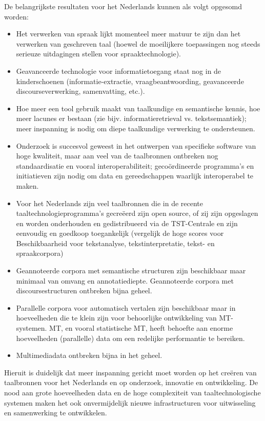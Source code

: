 \documentclass[]{../../metanetpaper}
\begin{document}
\begin{multicols}{2}
{De belangrijkste resultaten voor het Nederlands kunnen als volgt opgesomd worden:
\begin{itemize}
   \item Het verwerken van spraak lijkt momenteel meer matuur te zijn dan het verwerken van geschreven taal (hoewel de moeilijkere toepassingen nog steeds serieuze uitdagingen stellen voor spraaktechnologie).
   \item Geavanceerde technologie voor informatietoegang staat nog in de kinderschoenen (informatie-extractie, vraagbeantwoording, geavanceerde discourseverwerking, samenvatting, etc.).
   \item Hoe meer een tool gebruik maakt van taalkundige en semantische kennis, hoe meer lacunes er bestaan (zie bijv. informatieretrieval vs. tekstsemantiek); meer inspanning is nodig om diepe taalkundige verwerking te ondersteunen.
   \item Onderzoek is succesvol geweest in het ontwerpen van specifieke software van hoge kwaliteit, maar aan veel van de taalbronnen ontbreken nog standaardisatie en vooral interoperabiliteit; geco{\"o}rdineerde programma's en initiatieven zijn nodig om data en gereedschappen waarlijk interoperabel te maken.
   \item Voor het Nederlands zijn veel taalbronnen die in de recente taaltechnologieprogramma's gecre{\"e}erd zijn open source, of zij zijn opgeslagen en worden onderhouden en gedistribueerd via de TST-Centrale en zijn eenvoudig en goedkoop toegankelijk (vergelijk de hoge scores voor Beschikbaarheid voor tekstanalyse, tekstinterpretatie, tekst- en spraakcorpora)
   \item Geannoteerde corpora met semantische structuren zijn beschikbaar maar minimaal van omvang en annotatiediepte. Geannoteerde corpora met discoursestructuren ontbreken bijna geheel.
   \item Parallelle corpora voor automatisch vertalen zijn beschikbaar maar in hoeveelheden die te klein zijn voor behoorlijke ontwikkeling van MT-systemen. MT, en vooral statistische MT, heeft behoefte aan enorme hoeveelheden (parallelle) data om een redelijke performantie te bereiken.
   \item Multimediadata ontbreken bijna in het geheel.
   \end{itemize}

Hieruit is duidelijk dat meer inspanning gericht moet worden op het cre{\"e}ren van taalbronnen voor het Nederlands en op onderzoek, innovatie en ontwikkeling. De nood aan grote hoeveelheden data en de hoge complexiteit van taaltechnologische systemen maken het ook onvermijdelijk nieuwe infrastructuren voor uitwisseling en samenwerking te ontwikkelen.

}
\end{multicols}
\end{document}
